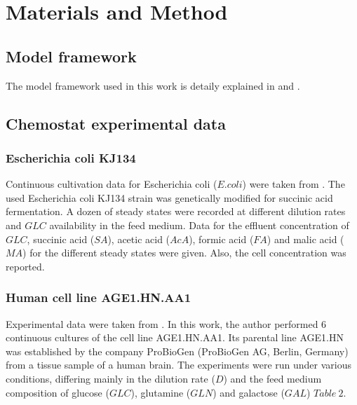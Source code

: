 \documentclass[]{article}
\begin{document}
	
	
	
	
	\section{Materials and Method}
	
	
	\subsection{Model framework }
	The model framework used in this work is detaily explained in  and .
	
	\subsection{Chemostat experimental data} 
	
	\subsubsection{Escherichia coli KJ134} 
	Continuous cultivation data for Escherichia coli ($E. coli$) were taken from . The used Escherichia coli KJ134 strain was genetically modified for succinic acid fermentation. A dozen of steady states were recorded at different dilution rates and $GLC$ availability in the feed medium. Data for the effluent concentration of $GLC$, succinic acid ($SA$), acetic acid ($AcA$), formic acid ($FA$) and malic acid ($MA$) for the different steady states were given. Also, the cell concentration was reported.
	
	
	\subsubsection{Human cell line AGE1.HN.AA1} 
	Experimental data were taken from . In this work, the author performed 6 continuous cultures of the cell line AGE1.HN.AA1. Its parental line AGE1.HN was established by the company ProBioGen (ProBioGen AG, Berlin, Germany) from a tissue sample of a human brain. The experiments were run under various conditions, differing mainly in the dilution rate ($D$) and the feed medium composition of glucose ($GLC$), glutamine ($GLN$) and galactose ($GAL$) $Table\ 2$.
	
\end{document}
